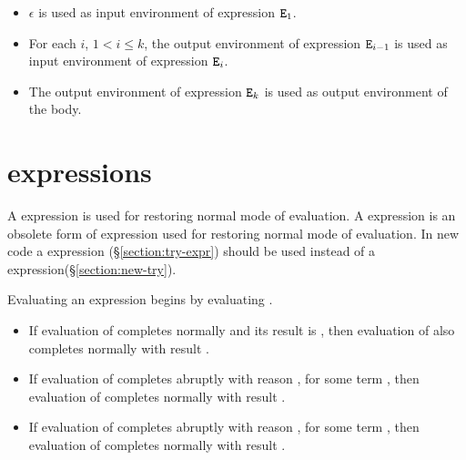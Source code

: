 \ENVIRONMENTS

\begin{itemize}
\item $\epsilon$ is used as input environment of expression ${\tt{\sl E}}_1$.
\item For each $i$, $1< i\leq k$, the output environment of
expression ${\tt{\sl E}}_{i-1}$ is used as input environment of expression
${\tt{\sl E}}_i$.
\item The output environment of expression ${\tt{\sl E}}_k$ is
used as output environment of the body.
\end{itemize}

\section{ expressions}

\label{section:catch}

\ifOld
A  expression is used for restoring normal mode of
evaluation.
\else
A  expression is an obsolete form of expression used for
restoring normal mode of evaluation.  In new code a 
expression (\S\ref{section:try-expr}) should be used instead of a
 expression\ifDiff (\S\ref{section:new-try})\fi.
\fi

\SYNTAX

\begin{rules}
       {  \OR
        }
\end{rules}

\EVALUATION

Evaluating an expression  begins by evaluating .
\begin{itemize}
\item If evaluation of  completes normally and its result is ,
then evaluation of  also completes normally with result
.
\item If evaluation of  completes abruptly with reason
, for some term , then evaluation
of  completes normally with result .
\item If evaluation of  completes abruptly with reason
,
for some term , then evaluation of  completes
normally with result .
\end{itemize}

